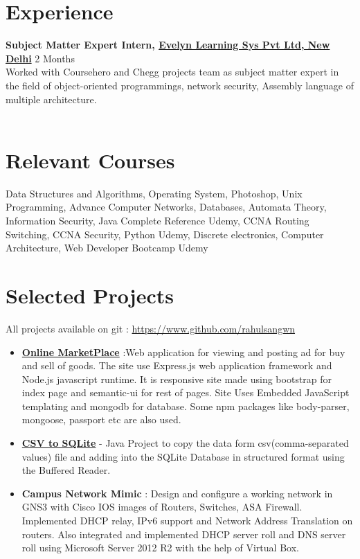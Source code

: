 \documentclass[margin, centered]{res}
\begin{document}
\begin{resume}
\section{Experience}
\textbf{Subject Matter Expert Intern, \href{https://evelynlearning.com/}{Evelyn Learning Sys Pvt Ltd, New Delhi}} \hfill 2 Months\\
Worked with Coursehero and Chegg projects team as subject matter expert in the field of object-oriented programmings, network security, Assembly language of multiple architecture. \\
\\

\section{Relevant \hspace{2mm} Courses}
Data Structures and Algorithms, Operating System, Photoshop, Unix Programming, Advance Computer Networks, Databases, Automata Theory, Information Security, Java Complete Reference Udemy, CCNA Routing Switching, CCNA Security, Python Udemy, Discrete electronics, Computer Architecture, Web Developer Bootcamp Udemy
\vspace{3mm}
\section{Selected Projects}
All projects available on git : \url{https://www.github.com/rahulsangwn}
\begin{itemize}[leftmargin=*]
 \item \textbf{\href{https://github.com/rahulsangwn/OnlineMarketPlace}{Online MarketPlace}} :Web application for viewing and posting ad for buy and sell of goods. The site use Express.js web application framework and Node.js javascript runtime. It is responsive site made using bootstrap for index page and semantic-ui for rest of pages. Site Uses Embedded JavaScript templating and mongodb for database. Some npm packages like body-parser, mongoose, passport etc are also used.
 \item \textbf{\href{https://github.com/rahulsangwn/CSVtoSQLite}{CSV to SQLite}} - Java Project to copy the data form csv(comma-separated values) file and adding into the SQLite Database in structured format using the Buffered Reader.
 \item \textbf{Campus Network Mimic} : Design and configure a working network in GNS3 with Cisco IOS images of Routers, Switches, ASA Firewall. Implemented DHCP relay, IPv6 support and Network Address Translation on routers. Also integrated and implemented DHCP server roll and DNS server roll using Microsoft Server 2012 R2 with the help of Virtual Box.


\end{itemize}
\end{resume}
\end{document}
